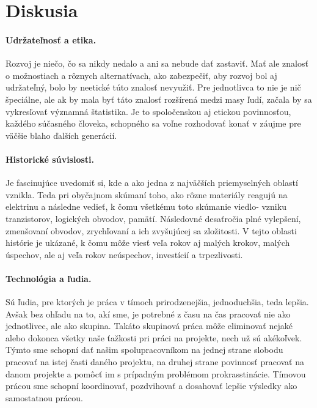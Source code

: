 \documentclass[10pt,twoside,slovak,a4paper]{article}
\begin{document}
\section{Diskusia} 
\label{dsk}
\paragraph{Udržateľnosť a etika.} Rozvoj je niečo, čo sa nikdy nedalo a ani sa nebude dať 
zastaviť. Mať ale znalosť o možnostiach a rôznych alternatívach, ako zabezpečiť, aby rozvoj 
bol aj udržateľný, bolo by neetické túto znalosť nevyužiť. Pre jednotlivca to nie je nič 
špeciálne, ale ak by mala byť táto znalosť rozšírená medzi masy ľudí, začala by sa 
vykresľovať významná štatistika. Je to spoločenskou aj etickou povinnosťou, každého 
súčasného človeka, schopného sa voľne rozhodovať konať v záujme pre väčšie blaho ďalších 
generácií.

\paragraph{Historické súvislosti.} Je fascinujúce uvedomiť si, kde a ako jedna z najväčších 
priemyselných oblastí vznikla. Teda pri obyčajnom skúmaní toho, ako rôzne  materiály reagujú 
na elektrinu a následne vedieť, k čomu všetkému toto skúmanie viedlo- vzniku tranzistorov, 
logických obvodov, pamätí. Následovné desaťročia plné vylepšení, zmenšovaní obvodov, 
zrychľovaní a ich zvyšujúcej sa zložitosti. V tejto oblasti histórie je ukázané, k čomu môže 
viesť veľa rokov aj malých krokov, malých úspechov, ale aj veľa rokov neúspechov, investícií 
a trpezlivosti.

\paragraph{Technológia a ľudia.} Sú ľudia, pre ktorých je práca v tímoch prirodzenejšia, 
jednoduchšia, teda lepšia. Avšak bez ohľadu na to, akí sme, je potrebné z času na čas 
pracovať nie ako jednotlivec, ale ako skupina. Takáto skupinová práca môže eliminovať nejaké 
alebo dokonca všetky naše ťažkosti pri práci na projekte, nech už sú akékoľvek. Týmto sme 
schopní dať našim spolupracovníkom na jednej strane slobodu pracovať na istej časti daného 
projektu, na druhej strane povinnosť pracovať na danom projekte a pomôcť im s prípadným 
problémom prokrasstinácie. Tímovou prácou sme schopní koordinovať, pozdvihovať a dosahovať 
lepšie výsledky ako samostatnou prácou.
\end{document}
